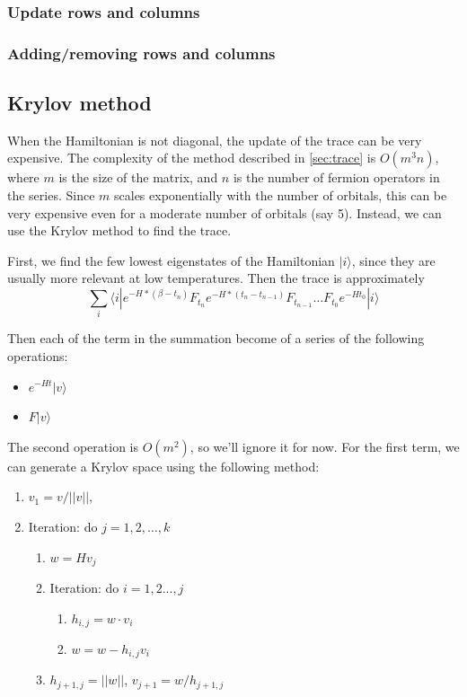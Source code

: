 \subsubsection{Update rows and columns}

\subsubsection{Adding/removing rows and columns}

\subsection{Krylov method}
\label{sec:cthyb_krylov}
When the Hamiltonian is not diagonal, the update of the trace can be very expensive.
 The complexity of the method described in \ref{sec:trace}
 is $O(m^3n)$, where $m$ is the size of the 
matrix, and $n$ is the number of fermion operators in the series. Since $m$ 
scales exponentially with the number of orbitals, this can be 
very expensive even for a moderate number of orbitals (say 5). Instead, we can 
use the Krylov method to find the trace.

First, we find the few lowest eigenstates of the Hamiltonian $|i\rangle$, since 
they are usually more relevant at low temperatures. Then the trace is 
approximately
\[
\sum_i\langle i|  e^{-H*(\beta-t_n)}F_{t_n}e^{-H*(t_n-t_{n-1})}F_{t_{n-1}}
\ldots F_{t_0}e^{-Ht_0}  |i\rangle
\]

Then each of the term in the summation become of a series of the following 
operations:
\begin{itemize}
\item $e^{-Ht}|v\rangle$
\item $F|v\rangle$
\end{itemize}

The second operation is $O(m^2)$, so we'll ignore it for now. For the first term,
we can generate a Krylov space using the following method: 
\begin{enumerate}
\item $v_1=v/||v||$,
\item Iteration: do $j=1,2,\ldots,k$ 
  \begin{enumerate}
  \item $w=Hv_j$
  \item Iteration: do $i=1,2...,j$
    \begin{enumerate}
    \item $h_{i,j}=w\cdot v_i$
    \item $w=w-h_{i,j}v_i$
    \end{enumerate}
  \item  $h_{j+1,j}=||w||$, $v_{j+1}=w/h_{j+1,j}$
  \end{enumerate}

\end{enumerate}

